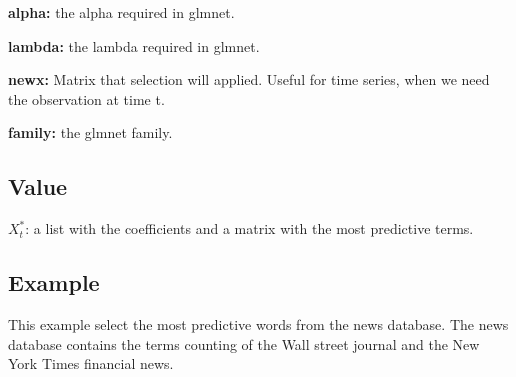 \documentclass[]{article}
\begin{document}
\textbf{alpha:} the alpha required in glmnet.

\textbf{lambda:} the lambda required in glmnet.

\textbf{newx:} Matrix that selection will applied. Useful for time
series, when we need the observation at time t.

\textbf{family:} the glmnet family.

\subsection{Value}\label{value-5}

\(X_{t}^{\ast}\): a list with the coefficients and a matrix with the
most predictive terms.

\subsection{Example}\label{example-5}

This example select the most predictive words from the news database.
The news database contains the terms counting of the Wall street journal
and the New York Times financial news.
\end{document}
